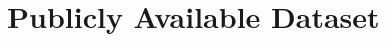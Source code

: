 \documentclass[conference]{IEEEtran}
\newcommand{\todo}[1]{\textcolor{cyan}{\textbf{[#1]}}}
\newcommand{\dan}[1]{\textcolor{blue}{{\it [Dan says: #1]}}}
\begin{document}











\section{Publicly Available Dataset}
\label{sec:dataset}
\end{document}
